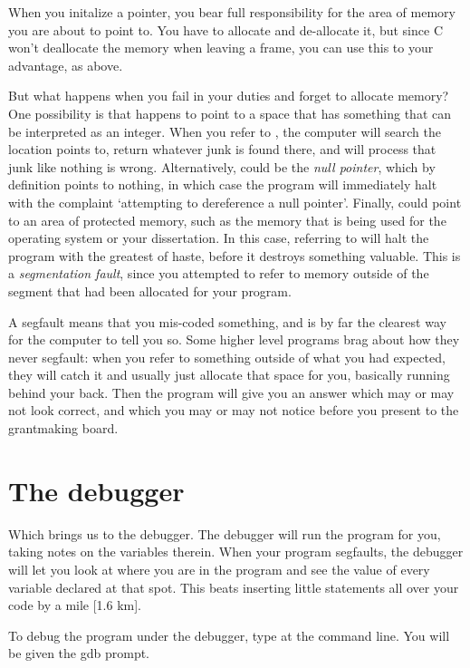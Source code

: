 \documentclass[12pt]{article}
\begin{document}
When you initalize a pointer, you bear full responsibility for the area
of memory you are about to point to. You have to allocate and de-allocate
it, but since C won't deallocate the memory when leaving a frame, you
can use this to your advantage, as above.

But what happens when you fail in your duties and forget to allocate
memory? One possibility is that  happens to point to a space
that has something that can be interpreted as an integer. When you refer
to , the computer will search the location 
points to, return whatever junk is found there, and will process that
junk like nothing is wrong. Alternatively,  could be the
{\sl null pointer},  which by definition points to nothing, in which
case the program will immediately halt with the complaint `attempting to
dereference a null pointer'. Finally,  could point to an area of
protected memory, such as the memory that is being used for the operating
system or your dissertation. In this case, referring to  will
halt the program with the greatest of haste, before it destroys something
valuable. This is a {\sl segmentation fault}, since you attempted to refer
to memory outside of the segment that had been allocated for your program.

A segfault means that you mis-coded something, and 
is by far the clearest way for the computer to tell you so. Some higher level
programs brag about how they never segfault: when you refer to something
outside of what you had expected, they will catch it and usually just
allocate that space for you, basically running  behind your
back. Then the program will give you an answer which may or may not look
correct, and which you may or may not notice before you present to the
grantmaking board. 

\section{The debugger}   \label{debug}
Which brings us to the debugger. The debugger will run the program for
you, taking notes on the variables therein. When your program segfaults,
the debugger will let you look at where you
are in the program and see the value of every variable declared at that
spot. This beats inserting little  statements all over your
code by a mile [1.6 km].

To debug the program  under the debugger, type  at the command line.  You will be given the gdb prompt.
\end{document}
